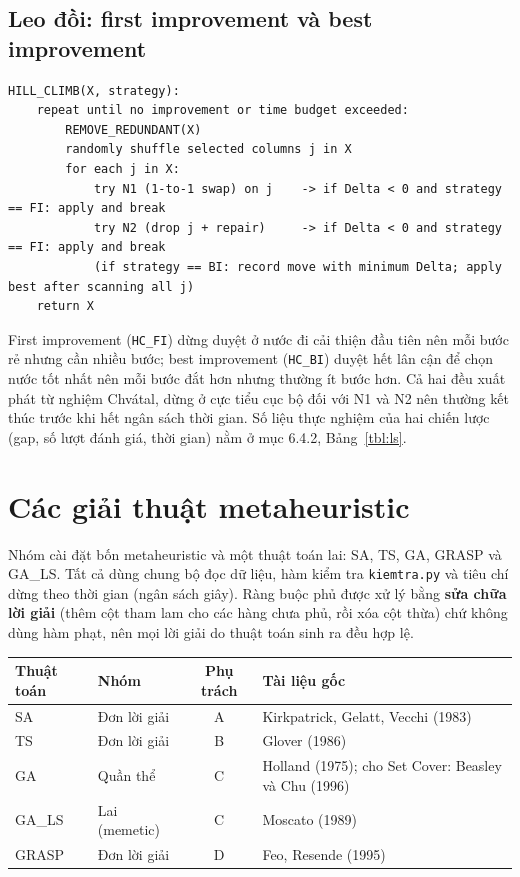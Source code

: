 \documentclass[a4paper,12pt]{article}
\begin{document}
\subsection{Leo đồi: first improvement và best improvement}
\begin{Verbatim}
HILL_CLIMB(X, strategy):
    repeat until no improvement or time budget exceeded:
        REMOVE_REDUNDANT(X)
        randomly shuffle selected columns j in X
        for each j in X:
            try N1 (1-to-1 swap) on j    -> if Delta < 0 and strategy == FI: apply and break
            try N2 (drop j + repair)     -> if Delta < 0 and strategy == FI: apply and break
            (if strategy == BI: record move with minimum Delta; apply best after scanning all j)
    return X
\end{Verbatim}
First improvement (\texttt{HC\_FI}) dừng duyệt ở nước đi cải thiện đầu tiên nên mỗi bước rẻ nhưng cần nhiều bước; best improvement (\texttt{HC\_BI}) duyệt hết lân cận để chọn nước tốt nhất nên mỗi bước đắt hơn nhưng thường ít bước hơn. Cả hai đều xuất phát từ nghiệm Chvátal, dừng ở cực tiểu cục bộ đối với N1 và N2 nên thường kết thúc trước khi hết ngân sách thời gian. Số liệu thực nghiệm của hai chiến lược (gap, số lượt đánh giá, thời gian) nằm ở mục 6.4.2, Bảng~\ref{tbl:ls}.

\section{Các giải thuật metaheuristic}
Nhóm cài đặt bốn metaheuristic và một thuật toán lai: SA, TS, GA, GRASP và GA\_LS. Tất cả dùng chung bộ đọc dữ liệu, hàm kiểm tra \texttt{kiemtra.py} và tiêu chí dừng theo thời gian (ngân sách giây). Ràng buộc phủ được xử lý bằng \textbf{sửa chữa lời giải} (thêm cột tham lam cho các hàng chưa phủ, rồi xóa cột thừa) chứ không dùng hàm phạt, nên mọi lời giải do thuật toán sinh ra đều hợp lệ.

\begin{center}
\begin{tabularx}{\textwidth}{llcY}
\toprule
Thuật toán & Nhóm & Phụ trách & Tài liệu gốc\\
\midrule
SA & Đơn lời giải & A & Kirkpatrick, Gelatt, Vecchi (1983)\\
TS & Đơn lời giải & B & Glover (1986)\\
GA & Quần thể & C & Holland (1975); cho Set Cover: Beasley và Chu (1996)\\
GA\_LS & Lai (memetic) & C & Moscato (1989)\\
GRASP & Đơn lời giải & D & Feo, Resende (1995)\\
\bottomrule
\end{tabularx}
\end{center}
\end{document}
